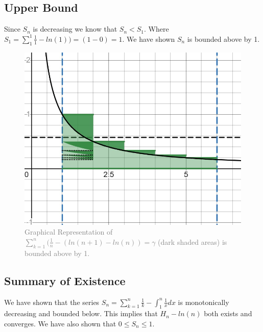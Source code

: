 \documentclass{article}
\begin{document}
\subsection{Upper Bound}
Since $S_n$ is decreasing we know that $S_n<S_1$.  Where $S_1 = \sum_1^1 \frac{1}{1} - ln(1))=(1-0)=1$. We have shown $S_n$ is bounded above by 1. 
\begin{figure}[htp]
    \centering
    \includegraphics[scale=0.3]{Upper Bound Graph.jpg}
    \caption{\textcolor{gray}{Graphical Representation of $\sum_{k=1}^n(\frac{1}{n}-(ln(n+1)-ln(n))=\gamma$ (dark shaded areas) is bounded above by 1.}}
    \label{fig:Riemann Sums}
\end{figure} 
\FloatBarrier
\subsection{Summary of Existence}
We have shown that the series $S_n=\sum_{k=1}^n \frac{1}{k}-\int_1^n \frac{1}{x}dx$ is monotonically decreasing and bounded below. This implies that $H_n-ln(n)$ both exists and converges. We have also shown that $0 \leq S_n \leq 1$.
\FloatBarrier
\end{document}
